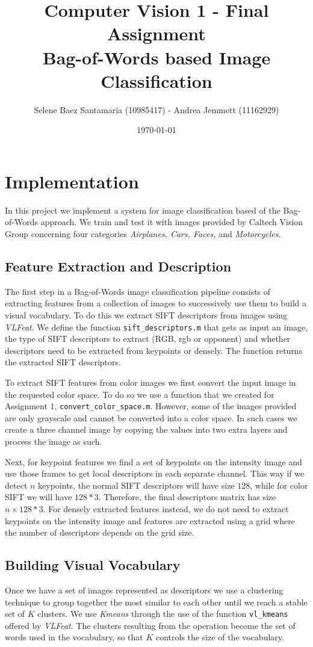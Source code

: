 \documentclass[11pt]{article}
\title{
	{Computer Vision 1 - Final Assignment\\
	 Bag-of-Words based Image Classification}
}
\author{
Selene Baez Santamaria (10985417) - Andrea Jemmett (11162929)}
\date{\today}
\begin{document}
\maketitle

\section{Implementation}
In this project we implement a system for image classification based of the Bag-of-Words approach. We train and test it with images provided by Caltech Vision Group concerning four categories \textit{Airplanes, Cars, Faces,} and \textit{Motorcycles}. 

\subsection{Feature Extraction and Description}
The first step in a Bag-of-Words image classification pipeline consists of
extracting features from a collection of images to successively use them to
build a visual vocabulary. To do this we extract SIFT descriptors from images
using \textit{VLFeat}. We define the function \texttt{sift\_descriptors.m}
that gets as input an image, the type of SIFT descriptors to extract (RGB, rgb
or opponent) and whether descriptors need to be extracted from keypoints or
densely. The function returns the extracted SIFT descriptors.

To extract SIFT features from color images we first convert the input image in
the requested color space. To do so we use a function that we created for Assignment 1, \texttt{convert\_color\_space.m}. However, some of the images provided are only grayscale and cannot be converted into a color space. In such cases we create a three channel image by copying the values into two extra layers and process the image as such. 

Next, for keypoint features we find a set of keypoints on the intensity image and use those frames to get local descriptors in each separate channel. This way if we detect $n$ keypoints, the normal SIFT descriptors will have size $128$, while for color SIFT we will have $128*3$. Therefore, the final descriptors matrix has size $n \times 128*3$.  For densely extracted features instead, we do not need to extract keypoints on the intensity image and features are extracted using a grid where the number of descriptors depends on the grid size.


\subsection{Building Visual Vocabulary}
Once we have a set of images represented as descriptors we use a clustering
technique to group together the most similar to each other until we reach a
stable set of $K$ clusters. We use \textit{Kmeans} through the use of the
function \texttt{vl\_kmeans} offered by \textit{VLFeat}. The clusters resulting from the operation become the set of words used in the vocabulary, so that $K$ controls the size of the vocabulary.
\end{document}

